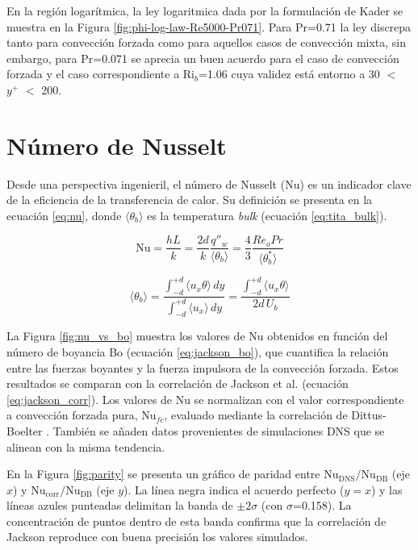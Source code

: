 En la región logarítmica, la ley logaritmica dada por la formulación de Kader \cite{kader1981temperature} se muestra en la Figura \ref{fig:phi-log-law-Re5000-Pr071}. Para Pr=0.71 la ley discrepa tanto para convección forzada como para aquellos casos de convección mixta, sin embargo, para Pr=0.071 se aprecia un buen acuerdo para el caso de convección forzada y el caso correspondiente a Ri$_b$=1.06 cuya validez está entorno a 30 $<$ $y^+$ $<$ 200.   

\newpage
\section{Número de Nusselt} \label{sec:nu}

Desde una perspectiva ingenieril, el número de Nusselt (Nu) es un indicador clave de la eficiencia de la transferencia de calor. Su definición se presenta en la ecuación \ref{eq:nu}, donde $\langle \theta_b \rangle$ es la temperatura \textit{bulk} (ecuación \ref{eq:tita_bulk}). 

\begin{equation}
\text{Nu} = \frac{h L}{k} = \frac{2d}{k} \frac{q''_w}{\langle \theta_b \rangle} = \frac{4}{3} \frac{Re_o Pr}{\langle \theta^*_b \rangle}	
\label{eq:nu}
\end{equation}

\begin{equation}
\langle \theta_b \rangle = \frac{\int_{-d}^{+d} \langle u_x \theta \rangle \, dy}{\int_{-d}^{+d} \langle u_x \rangle \, dy} = \frac{\int_{-d}^{+d} \langle u_x \theta \rangle }{2d \, U_b}
\label{eq:tita_bulk}
\end{equation}

La Figura \ref{fig:nu_vs_bo} muestra los valores de Nu obtenidos en función del número de boyancia Bo (ecuación \ref{eq:jackson_bo}), que cuantifica la relación entre las fuerzas boyantes y la fuerza impulsora de la convección forzada. Estos resultados se comparan con la correlación de Jackson et al. \cite{jackson1989studies} (ecuación \ref{eq:jackson_corr}). Los valores de Nu se normalizan con el valor correspondiente a convección forzada pura, Nu$_{fc}$, evaluado mediante la correlación de Dittus-Boelter \cite{incropera}. También se añaden datos provenientes de simulaciones DNS \cite{you2003direct} que se alinean con la misma tendencia.

En la Figura \ref{fig:parity} se presenta un gráfico de paridad entre $\text{Nu}_{\text{DNS}}/\text{Nu}_{\text{DB}}$ (eje $x$) y $\text{Nu}_{\text{corr}}/\text{Nu}_{\text{DB}}$ (eje $y$). La línea negra indica el acuerdo perfecto ($y=x$) y las líneas azules punteadas delimitan la banda de $\pm2\sigma$ (con $\sigma$=0.158). La concentración de puntos dentro de esta banda confirma que la correlación de Jackson reproduce con buena precisión los valores simulados.

